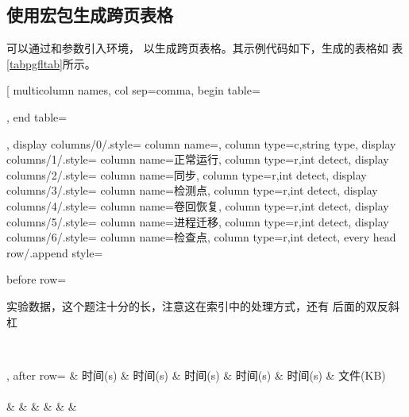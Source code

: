 \documentclass[scheme=chinese, heading = true, UTF8]{ctexart}
\begin{document}
  \subsection{使用宏包生成跨页表格}
  可以通过和参数引入环境，
  以生成跨页表格。其示例代码如下，生成的表格如
  表\ref{tabpgfltab}所示。

  \begin{center}
    \begin{minipage}[h]{0.9\linewidth}
      \begin{codeonly}
        \pgfplotstabletypeset[
          multicolumn names, %
          col sep=comma, %
          begin table=\begin{longtable}, %
          end table=\end{longtable},      
          display columns/0/.style={
            column name={}, %
            column type={c},string type},
          display columns/1/.style={
            column name=正常运行, %
            column type={r},int detect},
          display columns/2/.style={
            column name=同步, %
            column type={r},int detect},
          display columns/3/.style={
            column name=检测点, %
            column type={r},int detect},
          display columns/4/.style={
            column name=卷回恢复, %
            column type={r},int detect},
          display columns/5/.style={
            column name=进程迁移, %
            column type={r},int detect},
          display columns/6/.style={
            column name=检查点, %
            column type={r},int detect},      
          every head row/.append style={
            before row={\caption[实验数据]{实验数据，这个题注十分的长，注意这在索引中的处理方式，还有  后面的双反斜杠\label{tabpgfltab}}\\\toprule},
            after row={%
              & 时间(s) & 时间(s) & 时间(s) & 时间(s) & 时间(s) & 文件(KB)\\ %
              \midrule
              \endfirsthead
              \\
              \toprule
               &  &  &  & 
              &  &  \\
}}
\end{codeonly}
\end{minipage}
\end{center}
\end{document}
